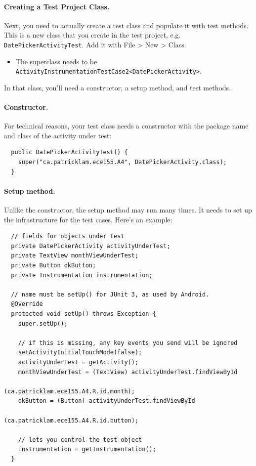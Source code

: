 \paragraph{Creating a Test Project Class.} 
Next, you need to actually create a test class and populate it with
test methods.  This is a new class that you create in the test
project, e.g. {\tt DatePickerActivityTest}.  Add it with File
\textgreater\- New \textgreater\- Class.  

\begin{itemize}
\item The superclass needs to be \verb+ActivityInstrumentationTestCase2<DatePickerActivity>+.
\end{itemize}

In that class, you'll need a
constructor, a setup method, and test methods.

\paragraph{Constructor.} For technical reasons, your test class needs a constructor with the
package name and class of the activity under test:

{\small
\begin{verbatim}
  public DatePickerActivityTest() {
    super("ca.patricklam.ece155.A4", DatePickerActivity.class);
  }
\end{verbatim}
}

\paragraph{Setup method.} Unlike the constructor, the setup method may run many times.
It needs to set up the infrastructure for the test cases. Here's an example:

{\small
\begin{verbatim}
  // fields for objects under test
  private DatePickerActivity activityUnderTest;
  private TextView monthViewUnderTest;
  private Button okButton;
  private Instrumentation instrumentation;

  // name must be setUp() for JUnit 3, as used by Android.
  @Override
  protected void setUp() throws Exception {
    super.setUp();

    // if this is missing, any key events you send will be ignored
    setActivityInitialTouchMode(false);
    activityUnderTest = getActivity();
    monthViewUnderTest = (TextView) activityUnderTest.findViewById
                                      (ca.patricklam.ece155.A4.R.id.month);
    okButton = (Button) activityUnderTest.findViewById
                                      (ca.patricklam.ece155.A4.R.id.button);

    // lets you control the test object
    instrumentation = getInstrumentation();
  }
\end{verbatim}
}

